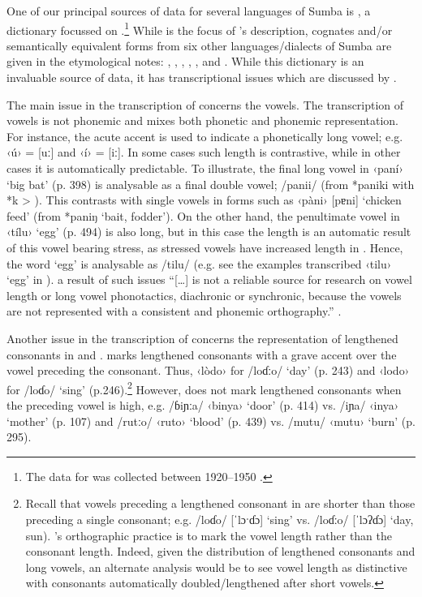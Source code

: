 One of our principal sources of data for several languages of
Sumba is \citet{Onvlee1984}, a dictionary focussed on .\footnote{
		The data for \citet{Onvlee1984}
		was collected between 1920--1950 \citep[259]{Klamer2009}.}
While 
is the focus of \citeauthor{Onvlee1984}’s description,
cognates and/or semantically equivalent forms from six other
languages/dialects of Sumba are given in the etymological notes:
, , , , , and .
While this dictionary is an invaluable source of data,
it has transcriptional issues which are discussed by \citet{Klamer2009}.

The main issue in the transcription of \citet{Onvlee1984} concerns the vowels.
The transcription of vowels is not phonemic
and mixes both phonetic and phonemic representation.
For instance, the acute accent is used to indicate a phonetically long vowel; e.g.
‹ú› = [uː] and ‹í› = [iː].
In some cases such length is contrastive,
while in other cases it is automatically predictable.
To illustrate, the final long vowel in ‹paní› ‘big bat’ (p.
398) is analysable as a final double vowel; /panii/ (from *paniki
with *k > {\0}).
This contrasts with single vowels in forms such as ‹pàni›
[pɐni] ‘chicken feed’ (from *paniŋ ‘bait, fodder’).
On the other hand,
the penultimate vowel in ‹tílu› ‘egg’ (p. 494) is also long,
but in this case the length is an automatic result of this vowel
bearing stress, as stressed vowels have increased length in  \citep[252]{Klamer2009}.
Hence, the word ‘egg’ is analysable as /tilu/ (e.g.
see the examples transcribed ‹tilu› ‘egg’ in \citealp[148, 207]{Klamer1998a}).
 a result of such issues “[{\ldots}] \citet{Onvlee1984} is
not a reliable source for research on  vowel length or
long vowel phonotactics, diachronic or synchronic, because the vowels are not represented
with a consistent and phonemic orthography.” \citep[253]{Klamer2009}.

Another issue in the transcription of \citet{Onvlee1984} concerns
the representation of lengthened consonants in  and .
\citeauthor{Onvlee1984} marks lengthened consonants with a grave accent over the
vowel preceding the consonant.
Thus,  ‹lòdo› for /loɗːo/ ‘day’ (p.
243) and ‹lodo› for /loɗo/ ‘sing’ (p.246).\footnote{
		Recall that vowels preceding a lengthened consonant in  are shorter
		than those preceding a single consonant; e.g.
		/loɗo/ [ˈlɔˑɗɔ] ‘sing’ vs.
		/loɗːo/ [ˈlɔʔɗɔ] ‘day, sun).
		\citeauthor{Onvlee1984}’s orthographic practice is to mark the vowel length
		rather than the consonant length.
		Indeed, given the distribution of
		lengthened consonants and long vowels,
		an alternate analysis would be to see vowel length as distinctive
		with consonants automatically doubled/lengthened after short vowels.}
However, \citeauthor{Onvlee1984} does not mark
lengthened consonants when the preceding vowel is high,
e.g.  /ɓiɲːa/ ‹binya› ‘door’ (p. 414) vs.
/iɲa/ ‹inya› ‘mother’ (p.
107) and /rutːo/ ‹ruto› ‘blood’ (p. 439) vs.
/mutu/ ‹mutu› ‘burn’ (p. 295).

